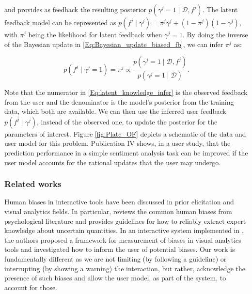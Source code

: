 \documentclass[dissertation,math,vertlayout,pdfa,colorlinks]{aaltoseries}
\newcommand{\bD}{\mathcal{D}}
\begin{document}
\noindent and provides as feedback the resulting posterior  $p(\gamma^j=1 \mid \bD, f^{j})$. The latent feedback model can be represented as $p(f^{j}\mid \gamma^j) = \pi^j \gamma^j + (1-\pi^j) (1-\gamma^j)$, with $\pi^j$ being the likelihood for latent feedback when $\gamma^j=1$. By doing the inverse of the Bayesian update in \ref{Eq:Bayesian_update_biased_fb}, we can infer $\pi^j$ as:

\begin{equation}\label{Eq:latent_knowledge_infer}
p(f^{j}\mid \gamma^j=1)=\pi^j \propto \dfrac{p(\gamma^j=1 \mid \bD, f^{j})}{p(\gamma^j =1\mid \bD)}.
\end{equation}  

Note that the numerator in \ref{Eq:latent_knowledge_infer} is the observed feedback from the user and the denominator is the model's posterior from the training data, which both are available. We can then use the inferred user feedback $p(f^{j}\mid \gamma^j)$, instead of the observed one, to update the posterior for the parameters of interest. Figure \ref{fig:Plate_OF} depicts a schematic of the data and user model for this problem. Publication IV shows, in a user study, that the prediction performance in a simple sentiment analysis task can be improved if the user model accounts for the rational updates that the user may undergo.

\subsubsection{Related works}

Human biases in interactive tools have been discussed in prior elicitation \cite{garthwaite2005statistical} and visual analytics \cite{bias_warning} fields. In particular, \cite{garthwaite2005statistical} reviews the common human biases from psychological literature and provides guidelines for how to reliably extract expert knowledge about uncertain quantities. In an interactive system implemented in \cite{bias_warning}, the authors proposed a framework for measurement of biases in visual analytics tools and investigated how to inform the user of potential biases. Our work is fundamentally different as we are not limiting (by following a guideline) or interrupting (by showing a warning) the interaction, but rather, acknowledge the presence of such biases and allow the user model, as part of the system, to account for those.

\end{document}
